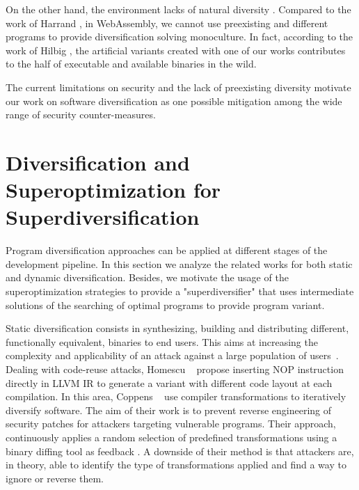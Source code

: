 On the other hand, the \wasm environment lacks of natural diversity \cite{natural_diversity}. Compared to the work of Harrand \etal \citationneeded, in WebAssembly, we cannot use preexisting and different programs to provide diversification solving monoculture. In fact, according to the work of Hilbig \etal \cite{Hilbig2021AnES}, the artificial variants created with one of our works contributes to the half of executable and available \wasm binaries in the wild. 


The current limitations on security and the lack of preexisting diversity motivate our work on software diversification as one possible mitigation among the wide range of security counter-measures.

\section{Diversification and Superoptimization for Superdiversification}
\label{sota:diversification}

Program diversification approaches can be applied at different stages of the development pipeline. In this section we analyze the related works for both static and dynamic diversification. Besides, we motivate the usage of the superoptimization strategies to provide a "superdiversifier" that uses intermediate solutions of the searching of optimal programs to provide program variant. 


Static diversification consists in synthesizing, building and distributing different, functionally equivalent, binaries to end users. This aims at increasing the complexity and applicability of an attack against a large population of users~\cite{cohen1993operating}. 
Dealing with code-reuse attacks, Homescu \etal~\cite{homescu2013profile} propose inserting NOP instruction directly in LLVM IR to generate a variant with different code layout at each compilation. 
In this area, Coppens \etal~\cite{coppens2013feedback} use compiler transformations to iteratively diversify software.
The aim of their work is to prevent reverse engineering of security patches for attackers targeting vulnerable programs.
Their approach, continuously applies a random selection of predefined transformations using a binary diffing tool as feedback \citationneeded.
A downside of their method is that attackers are, in theory, able to identify the type of transformations applied and find a way to ignore or reverse them.

